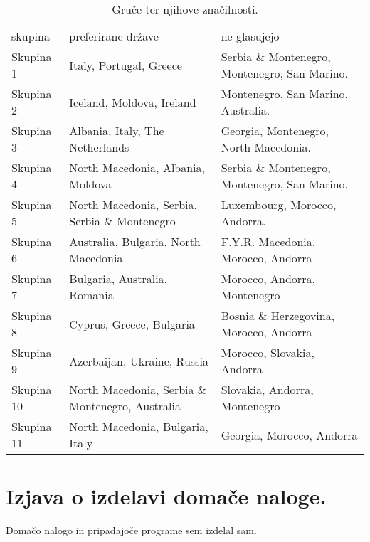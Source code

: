 \documentclass[a4paper,11pt]{article}
\begin{document}
\begin{table}[htbp]
\caption{Gruče ter njihove značilnosti.}
\label{tab1}
\begin{center}
\begin{tabular}{llp{6cm}}
\hline
skupina & preferirane države & ne glasujejo \\
Skupina 1 & Italy, Portugal, Greece & Serbia \& Montenegro, Montenegro, San Marino. \\
Skupina 2 & Iceland, Moldova, Ireland & Montenegro, San Marino, Australia. \\
Skupina 3 & Albania, Italy, The Netherlands & Georgia, Montenegro, North Macedonia. \\
Skupina 4 & North Macedonia, Albania, Moldova & Serbia \& Montenegro, Montenegro, San Marino. \\
Skupina 5 & North Macedonia, Serbia, Serbia \& Montenegro & Luxembourg, Morocco, Andorra. \\
Skupina 6 & Australia, Bulgaria, North Macedonia & F.Y.R. Macedonia, Morocco, Andorra \\
Skupina 7 & Bulgaria, Australia, Romania & Morocco, Andorra, Montenegro \\
Skupina 8 & Cyprus, Greece, Bulgaria & Bosnia \& Herzegovina, Morocco, Andorra \\
Skupina 9 & Azerbaijan, Ukraine, Russia & Morocco, Slovakia, Andorra \\
Skupina 10 & North Macedonia, Serbia \& Montenegro, Australia & Slovakia, Andorra, Montenegro \\
Skupina 11 & North Macedonia, Bulgaria, Italy & Georgia, Morocco, Andorra \\
\hline
\end{tabular}
\end{center}
\end{table}

\section{Izjava o izdelavi domače naloge.}
Domačo nalogo in pripadajoče programe sem izdelal sam.
\end{document}
